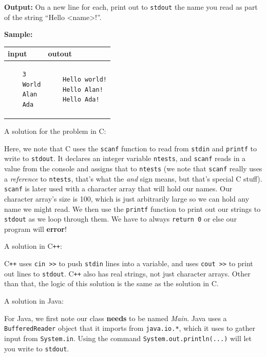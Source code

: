 \documentclass[a4paper]{article}
\begin{document}
\textbf{Output:} On a new line for each, print out to \texttt{stdout} the name you read as part of the string ``Hello \textless name\textgreater!''.

\textbf{Sample:}

\begin{tabular}{|p{}|p{}|}
    \hline
    \textbf{input} & \textbf{outout} \\
    \hline
    \begin{verbatim}
    3
    World
    Alan
    Ada
    \end{verbatim} &
    \begin{verbatim}
    Hello world!
    Hello Alan!
    Hello Ada!
    \end{verbatim} \\
    \hline
\end{tabular}
\newpage

A solution for the problem in C:


Here, we note that C uses the \texttt{scanf} function to read from \texttt{stdin} and \texttt{printf} to write to \texttt{stdout}. It declares an integer variable \texttt{ntests}, and \texttt{scanf} reads in a value from the console and assigns that to \texttt{ntests} (we note that \texttt{scanf} really uses a \textit{reference} to \texttt{ntests}, that's what the \textit{and} sign means, but that's special C stuff). \texttt{scanf} is later used with a character array that will hold our names. Our character array's size is 100, which is just arbitrarily large so we can hold any name we might read. We then use the \texttt{printf} function to print out our strings to \texttt{stdout} as we loop through them. We have to always \texttt{return 0} or else our program will \textbf{error}! 

A solution in C\texttt{++}:


C\texttt{++} uses \texttt{cin >>} to push \texttt{stdin} lines into a variable, and uses \texttt{cout >>} to print out lines to \texttt{stdout}. C\texttt{++} also has real strings, not just character arrays. Other than that, the logic of this solution is the same as the solution in C.
\newpage

A solution in Java:


For Java, we first note our class \textbf{needs} to be named \textit{Main}. Java uses a \texttt{BufferedReader} object that it imports from \texttt{java.io.*}, which it uses to gather input from \texttt{System.in}. Using the command \texttt{System.out.println(...)} will let you write to \texttt{stdout}.
\end{document}
